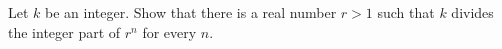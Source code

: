 Let $k$ be an integer. Show that there is a real number $r > 1$ such that $k$ divides the integer part of $r^n$ for every $n$.
